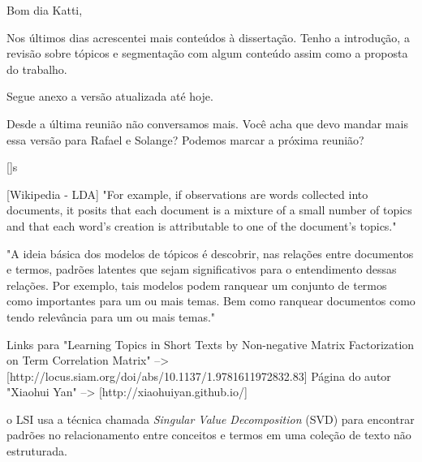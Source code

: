 



Bom dia Katti,


  Nos últimos dias acrescentei mais conteúdos à dissertação. Tenho a introdução, a revisão sobre tópicos e segmentação com algum conteúdo assim como a proposta do trabalho. 

  Segue anexo a versão atualizada até hoje. 

  Desde a última reunião não conversamos mais. Você acha que devo mandar mais essa versão para Rafael e Solange? Podemos marcar a próxima reunião?


  []s






[Wikipedia - LDA]
"For example, if observations are words collected into documents, it posits that each document is a mixture of a small number of topics and that each word's creation is attributable to one of the document's topics."

"A ideia básica dos modelos de tópicos é descobrir, nas relações entre documentos e termos, padrões latentes que sejam significativos para o entendimento dessas relações. Por exemplo, tais modelos podem ranquear um conjunto de termos como importantes para um ou mais temas. Bem como ranquear documentos como tendo relevância para um ou mais temas."





Links para "Learning Topics in Short Texts by Non-negative Matrix Factorization on Term Correlation Matrix" --> [http://locus.siam.org/doi/abs/10.1137/1.9781611972832.83]
Página do autor "Xiaohui Yan" --> [http://xiaohuiyan.github.io/]







o LSI usa a técnica chamada \textit{Singular Value Decomposition} (SVD) para encontrar padrões no relacionamento entre conceitos e termos em uma coleção de texto não estruturada.

